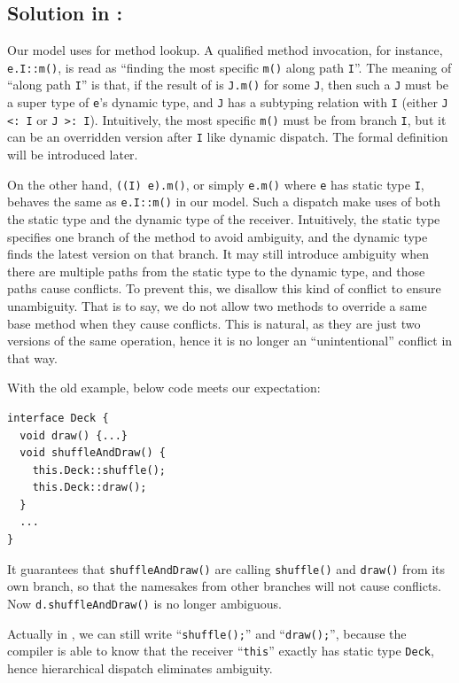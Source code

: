 \subsection{Solution in \MIM: \dispatchnamecaptical}
Our \MIM{} model uses \dispatchnameit{} for method lookup. A qualified method invocation, for instance, \lstinline|e.I::m()|, is read as ``finding the most specific \lstinline|m()| along path \lstinline|I|''. The meaning of ``along path \lstinline|I|'' is that, if the result of \dispatch{} is \lstinline|J.m()| for some \lstinline|J|, then such a \lstinline|J| must be a super type of \lstinline|e|'s dynamic type, and \lstinline|J| has a subtyping relation with \lstinline|I| (either \lstinline|J <: I| or \lstinline|J >: I|). Intuitively, the most specific \lstinline|m()| must be from branch \lstinline|I|, but it can be an overridden version after \lstinline|I| like dynamic dispatch. The formal definition will be introduced later.

On the other hand, \lstinline|((I) e).m()|, or simply \lstinline|e.m()| where \lstinline|e| has static type \lstinline|I|, behaves the same as \lstinline|e.I::m()| in our model. Such a dispatch make uses of both the static type and the dynamic type of the receiver. Intuitively, the static type specifies one branch of the method to avoid ambiguity, and the dynamic type finds the latest version on that branch. It may still introduce ambiguity when there are multiple paths from the static type to the dynamic type, and those paths cause conflicts. To prevent this, we disallow this kind of conflict to ensure unambiguity. That is to say, we do not allow two methods to override a same base method when they cause conflicts. This is natural, as they are just two versions of the same operation, hence it is no longer an ``unintentional'' conflict in that way.

With the old example, below code meets our expectation:
\vspace{3pt}\begin{lstlisting}
interface Deck {
  void draw() {...}
  void shuffleAndDraw() {
    this.Deck::shuffle();
    this.Deck::draw();
  }
  ...
}
\end{lstlisting}\vspace{3pt}
It guarantees that \lstinline|shuffleAndDraw()| are calling \lstinline|shuffle()| and \lstinline|draw()| from its own branch, so that the namesakes
from other branches will not cause conflicts. Now \lstinline|d.shuffleAndDraw()| is no longer ambiguous.

Actually in \MIM{}, we can still write ``\lstinline|shuffle();|'' and ``\lstinline|draw();|'',
because the compiler is able to know that the receiver ``\lstinline|this|'' exactly has static type \lstinline|Deck|, hence hierarchical dispatch eliminates ambiguity.

